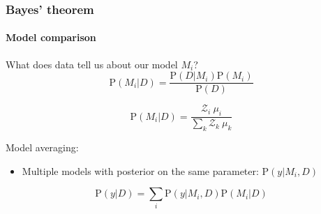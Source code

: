 \documentclass[]{beamer}
\newcommand{\posterior}{\mathcal{P}}
\newcommand{\prior}{\pi}
\newcommand{\ev}{\mathcal{Z}}
\newcommand{\prob}{\mathrm{P}}
\begin{document}
\begin{frame}
  \frametitle{Bayes' theorem}
  \framesubtitle{Model comparison}
  \pause
  What does data tell us about our model $M_i$?
  \pause
    \[\prob(M_i|D) = \frac{\prob(D|M_i) \prob(M_i) }{ \prob(D) }\] 

  \pause
    \[\prob(M_i|D) = \frac{\ev_i \: \mu_i}{\sum_k \ev_k \: \mu_k}\] 

  \pause
  Model averaging:
  \begin{itemize}
        \item Multiple models with posterior on the same parameter: ${\prob(y|M_i,D)}$
  \end{itemize}
  \[\prob(y|D) = \sum_i \prob(y|M_i,D) \prob(M_i|D)\]


\end{frame}

%
% 
%
%
% 
\end{document}
